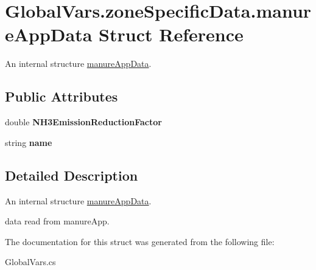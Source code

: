 \hypertarget{struct_global_vars_1_1zone_specific_data_1_1manure_app_data}{}\section{Global\+Vars.\+zone\+Specific\+Data.\+manure\+App\+Data Struct Reference}
\label{struct_global_vars_1_1zone_specific_data_1_1manure_app_data}


An internal structure \mbox{\hyperlink{struct_global_vars_1_1zone_specific_data_1_1manure_app_data}{manure\+App\+Data}}.  


\subsection*{Public Attributes}
\begin{DoxyCompactItemize}
\item 
\mbox{\label{struct_global_vars_1_1zone_specific_data_1_1manure_app_data_a0b82f6dc3e8aaa6c3039b765d74bf66a}} 
double {\bfseries N\+H3\+Emission\+Reduction\+Factor}
\item 
\mbox{\label{struct_global_vars_1_1zone_specific_data_1_1manure_app_data_aa848820d888c7adb178c6c76fd6f9a6b}} 
string {\bfseries name}
\end{DoxyCompactItemize}


\subsection{Detailed Description}
An internal structure \mbox{\hyperlink{struct_global_vars_1_1zone_specific_data_1_1manure_app_data}{manure\+App\+Data}}. 

data read from manure\+App. 

The documentation for this struct was generated from the following file\+:\begin{DoxyCompactItemize}
\item 
Global\+Vars.\+cs\end{DoxyCompactItemize}
